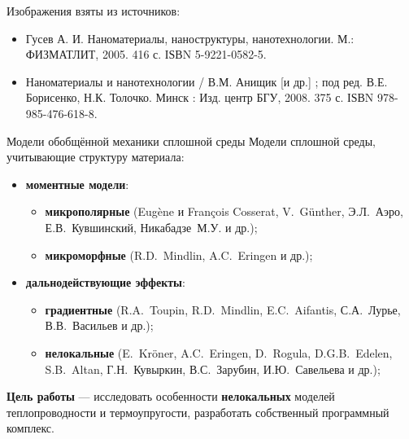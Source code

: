 \begin{frame}
	\bigskip	
	
	Изображения взяты из источников:
\begin{itemize}
	\justifying
	\item Гусев А. И. Наноматериалы, наноструктуры, нанотехнологии. М.: ФИЗМАТЛИТ, 2005. 416 с. ІЅВN 5-9221-0582-5.
	\item Наноматериалы и нанотехнологии / В.М. Анищик [и др.] ; под ред. В.Е. Борисенко, Н.К. Толочко. Минск : Изд. центр БГУ, 2008. 375 с. ІЅВN 978-985-476-618-8.
\end{itemize}
\end{frame}

\begin{frame}{Модели обобщённой механики сплошной среды}
	Модели сплошной среды, учитывающие структуру материала:
	\begin{itemize}
		\item \textbf{моментные модели}:
		\begin{itemize}
			\justifying
			\item \textbf{микрополярные} (Eugène и François Cosserat, V.~G{\"u}nther, Э.Л.~Аэро, Е.В.~Кувшинский, Никабадзе~М.У. и др.);
			\item \textbf{микроморфные} (R.D.~Mindlin, A.C.~Eringen и др.);
		\end{itemize}
		\item \textbf{дальнодействующие эффекты}:
		\begin{itemize}
			\justifying
			\item \textbf{градиентные} (R.A.~Toupin, R.D.~Mindlin, E.C.~Aifantis, С.А.~Лурье, В.В.~Васильев и др.);
			\item \textbf{нелокальные} (E.~Kr{\"o}ner, A.C.~Eringen, D.~Rogula, D.G.B.~Edelen, S.B.~Altan, Г.Н.~Кувыркин, В.С.~Зарубин, И.Ю.~Савельева и др.);
		\end{itemize}
	\end{itemize}
	
	\justifying
	\bigskip
	\textbf{Цель работы} --- исследовать особенности \textbf{нелокальных} моделей теплопроводности и термоупругости, разработать собственный программный комплекс.
	

\end{frame}
